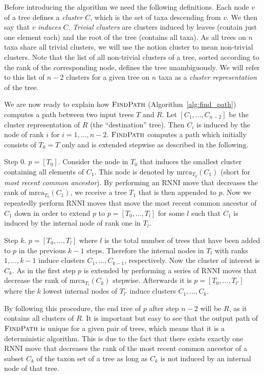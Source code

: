 \documentclass{amsart}
\newcommand{\mrca}{\mathrm{mrca}}
\newcommand{\rnni}{\mathrm{RNNI}}
\newcommand{\findpath}{\textsc{FindPath}}
\begin{document}
Before introducing the algorithm we need the following definitions.
Each node $v$ of a tree defines a \emph{cluster} $C$, which is the set of taxa descending from $v$.
We then say that $v$ \emph{induces} $C$.
\emph{Trivial clusters} are clusters induced by leaves (contain just one element each) and the root of the tree (contains all taxa).
As all trees on $n$ taxa share all trivial clusters, we will use the notion cluster to mean non-trivial clusters.
Note that the list of all non-trivial clusters of a tree, sorted according to the rank of the corresponding node, defines the tree unambiguously.
We will refer to this list of $n-2$ clusters for a given tree on $n$ taxa as a \emph{cluster representation} of the tree.

We are now ready to explain how $\findpath$ (Algorithm~\ref{alg:find_path}) computes a path between two input trees $T$ and $R$.
Let $[C_1, \ldots, C_{n-2}]$ be the cluster representation of $R$ (the ``destination'' tree).
Then $C_i$ is induced by the node of rank $i$ for $i = 1, \ldots, n-2$.
$\findpath$ computes a path which initially consists of $T_0 = T$ only and is extended stepwise as described in the following.

Step $0$. $p = [T_0]$.
Consider the node in $T_0$ that induces the smallest cluster containing all elements of $C_1$.
This node is denoted by $\mrca_{T_0}(C_1)$ (short for \emph{most recent common ancestor}).
By performing an $\rnni$ move that decreases the rank of $\mrca_{T_0}(C_1)$, we receive a tree $T_1$ that is then appended to $p$.
Now we repeatedly perform $\rnni$ moves that move the most recent common ancestor of $C_1$ down in order to extend $p$ to $p = [T_0, \ldots, T_l]$ for some $l$ such that $C_1$ is induced by the internal node of rank one in $T_l$.

Step $k$. $p = [T_0, \ldots, T_l]$ where $l$ is the total number of trees that have been added to $p$ in the previous $k-1$ steps.
Therefore the internal nodes in $T_l$ with ranks $1, \ldots, k-1$ induce clusters $C_1, \ldots, C_{k-1}$, respectively.
Now the cluster of interest is $C_k$.
As in the first step $p$ is extended by performing a series of $\rnni$ moves that decrease the rank of $\mrca_{T_l}(C_k)$ stepwise.
Afterwards it is $p = [T_0, \ldots, T_{l'}]$ where the $k$ lowest internal nodes of $T_{l'}$ induce clusters $C_1, \ldots, C_{k}$.

By following this procedure, the end tree of $p$ after step $n-2$ will be $R$, as it contains all clusters of $R$.
It is important but easy to see that the output path of $\findpath$ is unique for a given pair of trees, which means that it is a deterministic algorithm.
This is due to the fact that there exists exactly one $\rnni$ move that decreases the rank of the most recent common ancestor of a subset $C_k$ of the taxon set of a tree as long as $C_k$ is not induced by an internal node of that tree.
\end{document}
